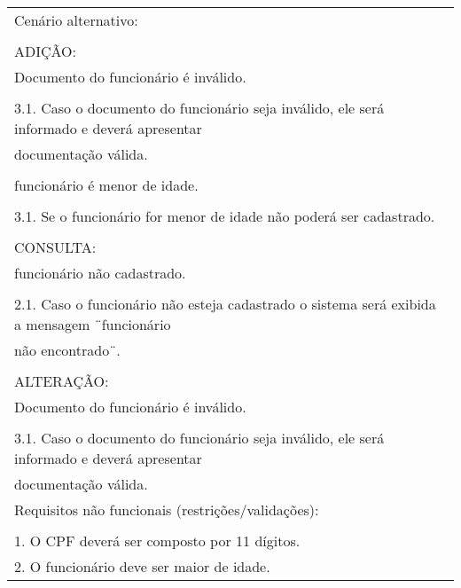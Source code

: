 \begin{longtable}{|l|}
Cenário alternativo:\\ \\ ADIÇÃO:\\ Documento do funcionário é inválido.\\        \\ 3.1. Caso o documento do funcionário seja inválido, ele será informado e deverá apresentar  \\ documentação válida.\\ \\funcionário é menor de idade.\\ \\3.1. Se o funcionário for menor de idade não poderá ser cadastrado.\\ \\ CONSULTA:\\ funcionário não cadastrado.\\ \\ 2.1. Caso o funcionário não esteja cadastrado o sistema será exibida a mensagem ¨funcionário\\ não encontrado¨.\\ \\ ALTERAÇÃO:\\ Documento do funcionário é inválido.\\ \\ 3.1. Caso o documento do funcionário seja inválido, ele será informado e deverá apresentar \\ documentação válida.\\ \hline
Requisitos não funcionais (restrições/validações):\\ \\         1. O CPF deverá ser composto por 11 dígitos.\\         2. O funcionário deve ser maior de idade.\\ \hline
\end{longtable}